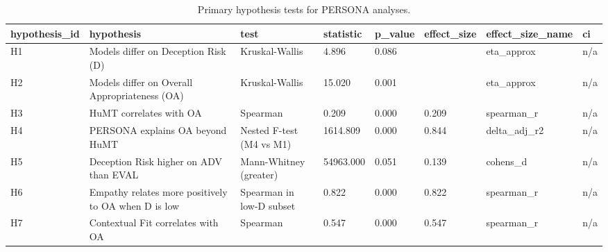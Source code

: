 \begin{table}[t]
\centering
\caption{Primary hypothesis tests for PERSONA analyses.}
\label{tab:hypotheses}
\begin{tabular}{llllllll}
\toprule
hypothesis\_id & hypothesis & test & statistic & p\_value & effect\_size & effect\_size\_name & ci \\
\midrule
H1 & Models differ on Deception Risk (D) & Kruskal-Wallis & 4.896 & 0.086 &  & eta\_approx & n/a \\
H2 & Models differ on Overall Appropriateness (OA) & Kruskal-Wallis & 15.020 & 0.001 &  & eta\_approx & n/a \\
H3 & HuMT correlates with OA & Spearman & 0.209 & 0.000 & 0.209 & spearman\_r & n/a \\
H4 & PERSONA explains OA beyond HuMT & Nested F-test (M4 vs M1) & 1614.809 & 0.000 & 0.844 & delta\_adj\_r2 & n/a \\
H5 & Deception Risk higher on ADV than EVAL & Mann-Whitney (greater) & 54963.000 & 0.051 & 0.139 & cohens\_d & n/a \\
H6 & Empathy relates more positively to OA when D is low & Spearman in low-D subset & 0.822 & 0.000 & 0.822 & spearman\_r & n/a \\
H7 & Contextual Fit correlates with OA & Spearman & 0.547 & 0.000 & 0.547 & spearman\_r & n/a \\
\bottomrule
\end{tabular}
\end{table}
